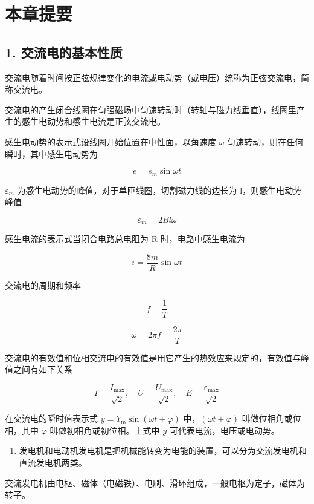 \section{本章提要}\label{ux672cux7ae0ux63d0ux8981-4}

\subsection{1.
交流电的基本性质}\label{ux4ea4ux6d41ux7535ux7684ux57faux672cux6027ux8d28}

交流电随着时间按正弦规律变化的电流或电动势（或电压）统称为正弦交流电，简称交流电。

交流电的产生闭合线圈在匀强磁场中匀速转动时（转轴与磁力线垂直），线圈里产生的感生电动势和感生电流是正弦交流电。

感生电动势的表示式设线圈开始位置在中性面，以角速度 \(\omega\)
匀速转动，则在任何瞬时，其中感生电动势为

\[
e = s_{m} \sin \omega t
\]

\(\varepsilon_{m}\) 为感生电动势的峰值，对于单匝线圈，切割磁力线的边长为
l，则感生电动势峰值

\[
\varepsilon_{m} = 2 B l \omega
\]

感生电流的表示式当闭合电路总电阻为 R 时，电路中感生电流为

\[
i = \frac{8 m}{R} \sin \omega t
\]

交流电的周期和频率

\[
f = \frac{1}{T}
\]

\[
\omega = 2 \pi f = \frac{2 \pi}{T}
\]

交流电的有效值和位相交流电的有效值是用它产生的热效应来规定的，有效值与峰值之间有如下关系

\[
I = \frac{I_{\mathrm{max}}}{\sqrt{2}}, \quad U = \frac{U_{\mathrm{max}}}{\sqrt{2}}, \quad E = \frac{\varepsilon_{\mathrm{max}}}{\sqrt{2}}
\]

在交流电的瞬时值表示式 \(y = Y_{\mathrm{m}} \sin (\omega t + \varphi)\)
中，\((\omega t + \varphi)\) 叫做位相角或位相，其中 \(\varphi\)
叫做初相角或初位相。上式中 \(y\) 可代表电流，电压或电动势。

\begin{enumerate}
\def\labelenumi{\arabic{enumi}.}
\setcounter{enumi}{1}
\tightlist
\item
  发电机和电动机发电机是把机械能转变为电能的装置，可以分为交流发电机和直流发电机两类。
\end{enumerate}

交流发电机由电枢、磁体（电磁铁）、电刷、滑环组成，一般电枢为定子，磁体为转子。

